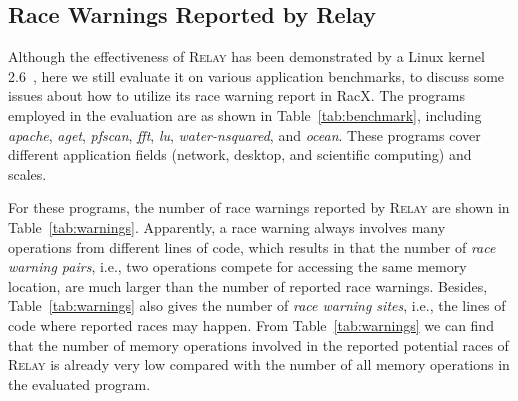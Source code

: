 \documentclass[10pt,onecolumn,letterpaper]{article}
\begin{document}
\subsection{Race Warnings Reported by Relay}
Although the effectiveness of R\textsc{elay} has been demonstrated
by a Linux kernel 2.6~\cite{Voung07FSE}, here we still evaluate it
on various application benchmarks, to discuss some issues about how
to utilize its race warning report in RacX. The programs employed in
the evaluation are as shown in Table~\ref{tab:benchmark}, including
\emph{apache}, \emph{aget}, \emph{pfscan}, \emph{fft}, \emph{lu},
\emph{water-nsquared}, and \emph{ocean}. These programs cover
different application fields (network, desktop, and scientific
computing) and scales.

\begin{table}[tb]
\caption{Evaluated Parallel
Programs}\label{tab:benchmark}
\end{table}


For these programs, the number of race warnings reported by
R\textsc{elay} are shown in Table~\ref{tab:warnings}. Apparently, a
race warning always involves many operations from different lines of
code, which results in that the number of \emph{race warning pairs},
i.e., two operations compete for accessing the same memory location,
are much larger than the number of reported race warnings. Besides,
Table~\ref{tab:warnings} also gives the number of \emph{race warning
sites}, i.e., the lines of code where reported races may happen.
From Table~\ref{tab:warnings} we can find that the number of memory
operations involved in the reported potential races of
R\textsc{elay} is already very low compared with the number of all
memory operations in the evaluated program.
\end{document}

